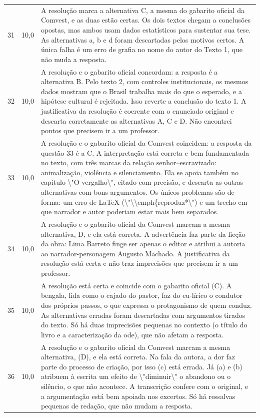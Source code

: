 \documentclass{article}%
\begin{document}
\begin{longtable}{@{}c c p{}@{}}
31 & 10,0 & A resolução marca a alternativa C, a mesma do gabarito oficial da Comvest, e as duas estão certas. Os dois textos chegam a conclusões opostas, mas ambos usam dados estatísticos para sustentar sua tese. As alternativas a, b e d foram descartadas pelos motivos certos. A única falha é um erro de grafia no nome do autor do Texto 1, que não muda a resposta. \\
32 & 10,0 & A resolução e o gabarito oficial concordam: a resposta é a alternativa B. Pelo texto 2, com controles institucionais, os mesmos dados mostram que o Brasil trabalha mais do que o esperado, e a hipótese cultural é rejeitada. Isso reverte a conclusão do texto 1. A justificativa da resolução é coerente com o enunciado original e descarta corretamente as alternativas A, C e D. Não encontrei pontos que precisem ir a um professor. \\
33 & 10,0 & A resolução e o gabarito oficial da Comvest coincidem: a resposta da questão 33 é a C. A interpretação está correta e bem fundamentada no texto, com três marcas da relação senhor--escravizado: animalização, violência e silenciamento. Ela se apoia também no capítulo \textbackslash{}"O vergalho\textbackslash{}", citado com precisão, e descarta as outras alternativas com bons argumentos. Os únicos problemas são de forma: um erro de LaTeX (\textbackslash{}"\textbackslash{}\textbackslash{}emph\{reproduz*\textbackslash{}") e um trecho em que narrador e autor poderiam estar mais bem separados. \\
34 & 10,0 & A resolução e o gabarito oficial da Comvest marcam a mesma alternativa, D, e ela está correta. A advertência faz parte da ficção da obra: Lima Barreto finge ser apenas o editor e atribui a autoria ao narrador{-}personagem Augusto Machado. A justificativa da resolução está certa e não traz imprecisões que precisem ir a um professor. \\
35 & 10,0 & A resolução está certa e coincide com o gabarito oficial (C). A bengala, lida como o cajado do pastor, faz do eu{-}lírico o condutor dos próprios passos, o que expressa o protagonismo de quem conduz. As alternativas erradas foram descartadas com argumentos tirados do texto. Só há duas imprecisões pequenas no contexto (o título do livro e a caracterização da ode), que não afetam a resposta. \\
36 & 10,0 & A resolução e o gabarito oficial da Comvest marcam a mesma alternativa, (D), e ela está correta. Na fala da autora, a dor faz parte do processo de criação, por isso (c) está errada. Já (a) e (b) atribuem à escrita um efeito de \textbackslash{}"diminuir\textbackslash{}" o abandono ou o silêncio, o que não acontece. A transcrição confere com o original, e a argumentação está bem apoiada nos excertos. Só há ressalvas pequenas de redação, que não mudam a resposta. \\

\end{longtable}
\end{document}
